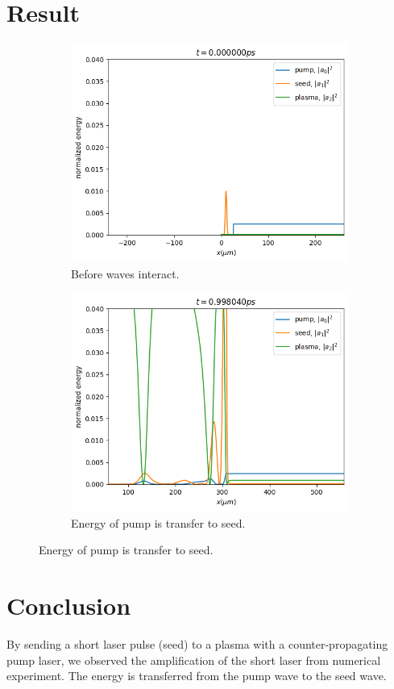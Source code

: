 \documentclass{article}
\begin{document}
    \section{Result}
    \begin{figure} [H]
        \begin{subfigure}[b]{0.5\textwidth}
            \includegraphics[width=\textwidth]{img/waves_t=0.png}
            \caption{Before waves interact.}    
        \end{subfigure}
        \begin{subfigure}[b]{0.5\textwidth}
            \includegraphics[width=\textwidth]{img/waves_t=1.png}
            \caption{Energy of pump is transfer to seed.}    
        \end{subfigure}
    \end{figure}

    \section{Conclusion}
    By sending a short laser pulse (seed) to a plasma with a counter-propagating pump laser, we observed the amplification of the short laser from numerical experiment. The energy is transferred from the pump wave to the seed wave. 

    \nocite{*}
    
    
\end{document}
